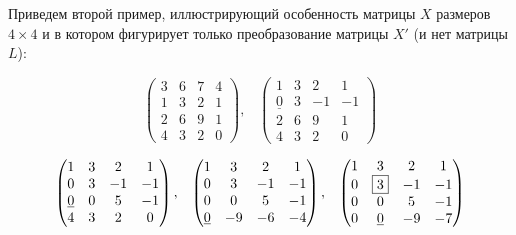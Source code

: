 {\noindent Приведем второй пример, иллюстрирующий особенность матрицы $X$\linebreak
размеров $4 \times 4$ и в котором фигурирует только преобразование матрицы
$X'$ (и нет матрицы $L$):




\begin{equation*}
\begin{pmatrix} 3 & 6 & 7 & 4 \\ 1 & 3 & 2 & 1 \\ 2 & 6 & 9 & 1 \\ 4 & 3 & 2 & 0 \end{pmatrix},\;\;\; \begin{pmatrix} 1 & 3 & 2 & 1 \\ \underline{0} & 3 & -1 & -1 \\ 2 & 6 & 9 & 1 \\ 4 & 3 & 2 & 0 \end{pmatrix}
\end{equation*}

\begin{equation*}
\begin{pmatrix} 1 & 3 & 2 & 1 \\ 0 & 3 & -1 & -1 \\ \underline{0} & 0 & 5 & -1 \\ 4 & 3 & 2 & 0 \end{pmatrix},\;\;\; \begin{pmatrix} 1 & 3 & 2 & 1 \\ 0 & 3 & -1 & -1 \\ 0 & 0 & 5 & -1 \\ \underline{0} & -9 & -6 & -4 \end{pmatrix},\;\;\; \begin{pmatrix} 1 & 3 & 2 & 1 \\ 0 & \fbox{3} & -1 & -1 \\ 0 & 0 & 5 & -1 \\ 0 & \underline{0} & -9 & -7 \end{pmatrix}
\end{equation*}

}
